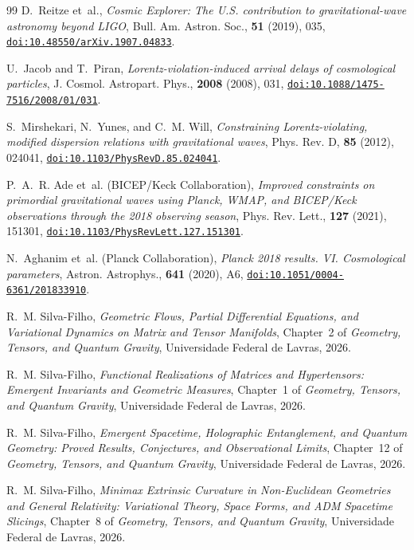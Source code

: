\documentclass[aps,prl,reprint,twocolumn,superscriptaddress,nofootinbib,floatfix]{revtex4-2}
\providecommand{\doi}[1]{\href{https://doi.org/#1}{\nolinkurl{doi:#1}}}
\begin{document}
\begin{thebibliography}{99}
D.~Reitze et~al.,
\emph{Cosmic Explorer: The U.S. contribution to gravitational-wave astronomy beyond LIGO},
Bull. Am. Astron. Soc., \textbf{51} (2019), 035,
\doi{10.48550/arXiv.1907.04833}.

U.~Jacob and T.~Piran,
\emph{Lorentz-violation-induced arrival delays of cosmological particles},
J. Cosmol. Astropart. Phys., \textbf{2008} (2008), 031,
\doi{10.1088/1475-7516/2008/01/031}.

S.~Mirshekari, N.~Yunes, and C.~M. Will,
\emph{Constraining Lorentz-violating, modified dispersion relations with gravitational waves},
Phys. Rev. D, \textbf{85} (2012), 024041,
\doi{10.1103/PhysRevD.85.024041}.

P.~A.~R. Ade et~al. (BICEP/Keck Collaboration),
\emph{Improved constraints on primordial gravitational waves using Planck, WMAP, and BICEP/Keck observations through the 2018 observing season},
Phys. Rev. Lett., \textbf{127} (2021), 151301,
\doi{10.1103/PhysRevLett.127.151301}.

N.~Aghanim et~al. (Planck Collaboration),
\emph{Planck 2018 results. VI. Cosmological parameters},
Astron. Astrophys., \textbf{641} (2020), A6,
\doi{10.1051/0004-6361/201833910}.

 R.~M. Silva-Filho, \emph{Geometric Flows, Partial Differential Equations, and Variational Dynamics on Matrix and Tensor Manifolds}, Chapter~2 of \emph{Geometry, Tensors, and Quantum Gravity}, Universidade Federal de Lavras, 2026.

 R.~M. Silva-Filho, \emph{Functional Realizations of Matrices and Hypertensors: Emergent Invariants and Geometric Measures}, Chapter~1 of \emph{Geometry, Tensors, and Quantum Gravity}, Universidade Federal de Lavras, 2026.

 R.~M. Silva-Filho, \emph{Emergent Spacetime, Holographic Entanglement, and Quantum Geometry: Proved Results, Conjectures, and Observational Limits}, Chapter~12 of \emph{Geometry, Tensors, and Quantum Gravity}, Universidade Federal de Lavras, 2026.

 R.~M. Silva-Filho, \emph{Minimax Extrinsic Curvature in Non-Euclidean Geometries and General Relativity: Variational Theory, Space Forms, and ADM Spacetime Slicings}, Chapter~8 of \emph{Geometry, Tensors, and Quantum Gravity}, Universidade Federal de Lavras, 2026.


\end{thebibliography}
\end{document}
